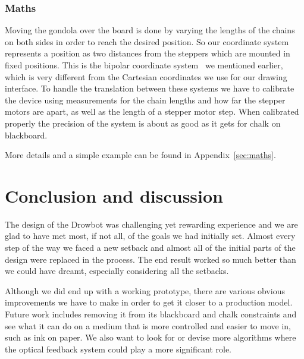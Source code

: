 \documentclass[a4paper,10pt]{article}
\begin{document}
\subsubsection*{Maths}
Moving the gondola over the board is done by varying the lengths of the
chains on both sides in order to reach the desired position.
So our coordinate system represents a position as two distances from
the steppers which are mounted in fixed positions.
This is the bipolar coordinate system~\cite{bipolar} we mentioned earlier,
which is very different from the Cartesian coordinates we use for our
drawing interface.
To handle the translation between these systems we have to calibrate
the device using measurements for the chain lengths and how far the
stepper motors are apart, as well as the length of a stepper motor
step.
When calibrated properly the precision of the system is about as good
as it gets for chalk on blackboard.

More details and a simple example can be found in Appendix~\ref{sec:maths}.

\section{Conclusion and discussion}
\label{sec:conclusion}




The design of the Drowbot was challenging yet rewarding experience
and we are glad to have met most, if not all, of the goals we had initially set.
Almost every step of the way we faced a new setback and almost all
of the initial parts of the design were replaced in the process.
The end result worked so much better than we could have dreamt,
especially considering all the setbacks.

Although we did end up with a working prototype, there are various obvious
improvements we have to make in order to get it closer to a production model.
Future work includes removing it from its blackboard and chalk
constraints and see what it can do on a medium that is
more controlled and easier to move in, such as ink on paper.
We also want to look for or devise more algorithms where the optical
feedback system could play a more significant role.
\end{document}

